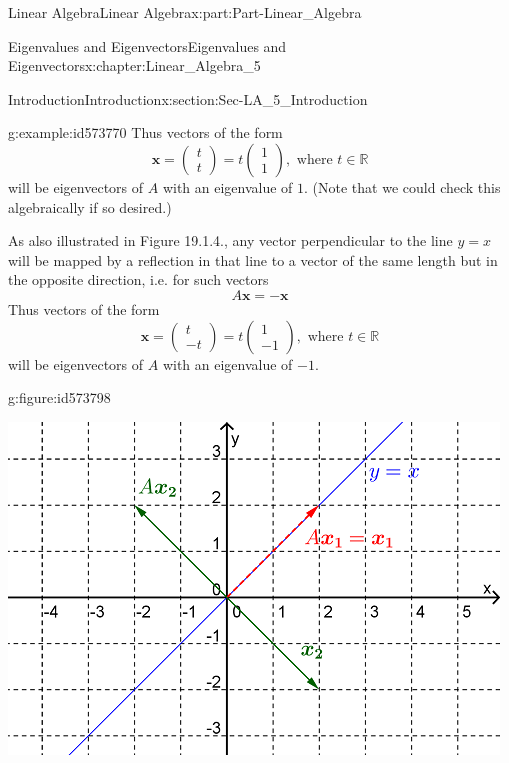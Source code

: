 \documentclass[oneside,10pt,]{book}
\numberwithin{equation}{section}
\begin{document}
\begin{partptx}{Linear Algebra}{}{Linear Algebra}{}{}{x:part:Part-Linear_Algebra}
\begin{chapterptx}{Eigenvalues and Eigenvectors}{}{Eigenvalues and Eigenvectors}{}{}{x:chapter:Linear_Algebra_5}
\begin{sectionptx}{Introduction}{}{Introduction}{}{}{x:section:Sec-LA_5_Introduction}
\begin{example}{}{g:example:id573770}
Thus vectors of the form%
\begin{equation*}
\mathbf{x}=\begin{pmatrix} t \\ t \end{pmatrix}=t\begin{pmatrix} 1 \\ 1 \end{pmatrix}, \textrm{ where } t\in \mathbb{R}
\end{equation*}
will be eigenvectors of \(A\) with an eigenvalue of \(1\). (Note that we could check this algebraically if so desired.)%
\par
As also illustrated in Figure 19.1.4., any vector perpendicular to the line \(y=x\) will be mapped by a reflection in that line to a vector of the same length but in the opposite direction, i.e. for such vectors%
\begin{equation*}
A\mathbf{x}=-\mathbf{x}
\end{equation*}
Thus vectors of the form%
\begin{equation*}
\mathbf{x}=\begin{pmatrix} t \\ -t \end{pmatrix}=t\begin{pmatrix} 1 \\ -1 \end{pmatrix}, \textrm{ where } t\in \mathbb{R}
\end{equation*}
will be eigenvectors of \(A\) with an eigenvalue of \(-1\). \begin{figureptx}{}{g:figure:id573798}{}%
\begin{image}{0.125}{0.75}{0.125}%
\includegraphics[width=\linewidth]{./LinearAlgebra/Images/5/figure1.png}

\end{image}
\end{figureptx}
\end{example}
\end{sectionptx}
\end{chapterptx}
\end{partptx}
\end{document}
